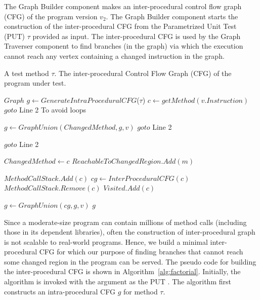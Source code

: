 The Graph Builder component makes an inter-procedural control flow graph (CFG) of the program version $v_2$. The Graph Builder component starts the construction of the inter-procedural CFG from the Parametrized Unit Test (PUT) $\tau$ provided as input. The inter-procedural CFG is used by the Graph Traverser component to find branches (in the graph) via which the execution cannot reach any vertex containing a changed instruction in the graph.
\newcommand{\factorial}{\ensuremath{\mbox{\sc Factorial}}}
\begin{algorithm}[h!]
\begin{tiny}
\caption{$InterProceduralCFG(\tau)$}\label{alg:factorial}
\begin{algorithmic}[1]
\REQUIRE A test method $\tau$.
\ENSURE The inter-procedural Control Flow Graph (CFG) of the program under test.

\medskip

\STATE $Graph$ $g \leftarrow GenerateIntraProceduralCFG$($\tau$)
 \STATE $c \leftarrow getMethod(v.Instruction)$
 \STATE $goto$ Line 2 To avoid loops
 \ENDIF
 
 
  \STATE $g \leftarrow GraphUnion(ChangedMethod, g, v)$ 
  \STATE $goto$ Line 2
 \ENDIF 
 
  \STATE $goto$ Line 2
 \ENDIF 
 
	 \STATE $ChangedMethod \leftarrow c $
		 \STATE $ReachableToChangedRegion.Add(m)$	
 	 \ENDFOR
 \ENDIF
 
 
 		
 \STATE $MethodCallStack.Add(c)$
 \STATE $cg \leftarrow InterProceduralCFG(c)$ 
 \STATE $MethodCallStack.Remove(c)$
 \STATE $Visited.Add(c)$
 
 \STATE $g \leftarrow GraphUnion(cg, g, v)$
 \ENDIF
\ENDFOR
\RETURN $g$
\label{alg:ICFG}
\end{algorithmic}
\end{tiny}
\end{algorithm}
Since a moderate-size program can contain millions of method calls (including those in its dependent libraries), often the construction of inter-procedural graph is not scalable to real-world programs. Hence, we build a minimal inter-procedural CFG for which our purpose of finding branches that cannot reach some changed region in the program can be served. The pseudo code for building the inter-procedural CFG is shown in Algorithm~\ref{alg:factorial}. Initially, the algorithm  is invoked with the argument as the PUT \CodeIn{$\tau$}. The algorithm first constructs an intra-procedural CFG $g$ for method $\tau$. 

